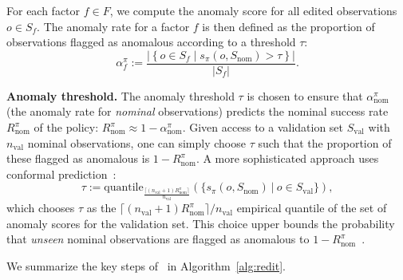 For each factor $f \in F$, we compute the anomaly score for all edited observations $o \in S_f$. 
The anomaly rate for a factor $f$ is then defined as the proportion of observations flagged as anomalous according to a threshold $\tau$:
\begin{equation}
    \alpha_f^\pi := \frac{\left| \left\{ o \in S_f \mid s_\pi(o, S_\text{nom}) > \tau \right\} \right|}{|S_f|}.
\end{equation}

{\bf Anomaly threshold.} The anomaly threshold $\tau$ is chosen to ensure that $\alpha_\text{nom}^\pi$ (the anomaly rate for \emph{nominal} observations) predicts the nominal success rate $R_\text{nom}^\pi$ of the policy: $R_\text{nom}^\pi \approx 1 - \alpha_\text{nom}^\pi$. Given access to a validation set $S_\text{val}$ with $n_\text{val}$ nominal observations, one can simply choose $\tau$ such that the proportion of these flagged as anomalous is $1 - R_\text{nom}^\pi$. A more sophisticated approach uses conformal prediction~\cite{vovk2005algorithmic}: 
\begin{equation}
\label{eq:tau}
    \tau := \text{quantile}_{ \frac{\lceil (n_\text{val}+1)R_\text{nom}^\pi\rceil}{n_\text{val}}}(\{s_\pi(o, S_\text{nom}) \ | \ o \in S_\text{val} \}),
\end{equation}
which chooses $\tau$ as the $\lceil (n_\text{val}+1)R_\text{nom}^\pi\rceil/{n_\text{val}}$ empirical quantile of the set of anomaly scores for the validation set. This choice upper bounds the probability that \emph{unseen} nominal observations are flagged as anomalous to $1 - R_\text{nom}^\pi$~\cite{angelopoulos2021gentle}. 

\vspace{7pt}

We summarize the key steps of \redit~in Algorithm~\ref{alg:redit}. 


